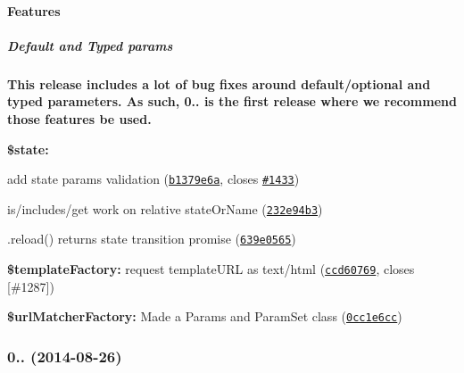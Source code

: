 {\bfseries {\bfseries {\bfseries {\bfseries \paragraph*{Features}}}}}

{\bfseries {\bfseries {\bfseries {\bfseries }}}}

{\bfseries {\bfseries {\bfseries {\bfseries \subparagraph*{Default and Typed params}}}}}

{\bfseries {\bfseries {\bfseries {\bfseries }}}}

{\bfseries {\bfseries {\bfseries {\bfseries This release includes a lot of bug fixes around default/optional and typed parameters. As such, 0.. is the first release where we recommend those features be used.}}}}

{\bfseries {\bfseries {\bfseries {\bfseries 
\begin{DoxyItemize}
\item {\bfseries \$state\+:}
\begin{DoxyItemize}
\item add state params validation (\href{https://github.com/angular-ui/ui-router/commit/b1379e6a4d38f7ed7436e05873932d7c279af578}{\tt b1379e6a}, closes \href{https://github.com/angular-ui/ui-router/issues/1433}{\tt \#1433})
\item is/includes/get work on relative state\+Or\+Name (\href{https://github.com/angular-ui/ui-router/commit/232e94b3c2ca2c764bb9510046e4b61690c87852}{\tt 232e94b3})
\item .reload() returns state transition promise (\href{https://github.com/angular-ui/ui-router/commit/639e0565dece9d5544cc93b3eee6e11c99bd7373}{\tt 639e0565})
\end{DoxyItemize}
\item {\bfseries \$template\+Factory\+:} request template\+U\+RL as text/html (\href{https://github.com/angular-ui/ui-router/commit/ccd6076904a4b801d77b47f6e2de4c06ce9962f8}{\tt ccd60769}, closes \mbox{[}\#1287\mbox{]})
\item {\bfseries \$url\+Matcher\+Factory\+:} Made a Params and Param\+Set class (\href{https://github.com/angular-ui/ui-router/commit/0cc1e6cc461a4640618e2bb594566551c54834e2}{\tt 0cc1e6cc})
\end{DoxyItemize}}}}}

{\bfseries {\bfseries {\bfseries {\bfseries \label{_0.2.11}%
 \subsubsection*{0.. (2014-\/08-\/26)}}}}}


